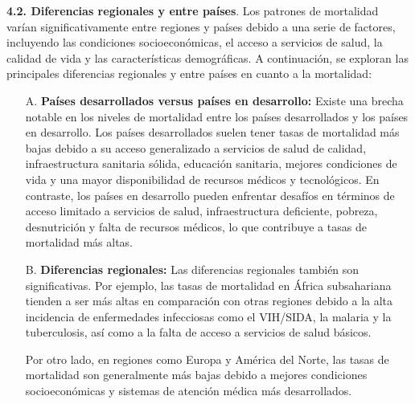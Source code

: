 \documentclass[8pt,a4paper]{beamer}
\begin{document}
{\begin{frame}{}
\setlength{\parskip}{3px}
\justifying
\begin{block}{\textbf{4.2. Diferencias regionales y entre países}.}
\setlength{\parskip}{3px}
\justifying
Los patrones de mortalidad varían significativamente entre regiones y países debido a una serie de factores, incluyendo las condiciones socioeconómicas, el acceso a servicios de salud, la calidad de vida y las características demográficas. A continuación, se exploran las principales diferencias regionales y entre países en cuanto a la mortalidad:
\begin{enumerate}
\setlength{\parskip}{3px}
\justifying
\item[A.] \textbf{Países desarrollados versus países en desarrollo:} Existe una brecha notable en los niveles de mortalidad entre los países desarrollados y los países en desarrollo. Los países desarrollados suelen tener tasas de mortalidad más bajas debido a su acceso generalizado a servicios de salud de calidad, infraestructura sanitaria sólida, educación sanitaria, mejores condiciones de vida y una mayor disponibilidad de recursos médicos y tecnológicos. En contraste, los países en desarrollo pueden enfrentar desafíos en términos de acceso limitado a servicios de salud, infraestructura deficiente, pobreza, desnutrición y falta de recursos médicos, lo que contribuye a tasas de mortalidad más altas.

\item[B.] \textbf{Diferencias regionales:} Las diferencias regionales también son significativas. Por ejemplo, las tasas de mortalidad en África subsahariana tienden a ser más altas en comparación con otras regiones debido a la alta incidencia de enfermedades infecciosas como el VIH/SIDA, la malaria y la tuberculosis, así como a la falta de acceso a servicios de salud básicos.

\end{enumerate}
\end{block}
\end{frame}

\begin{frame}{}
\setlength{\parskip}{3px}
\justifying
\begin{block}{}
\setlength{\parskip}{3px}
\justifying
\begin{enumerate}
\setlength{\parskip}{3px}
\justifying
\item[{}] Por otro lado, en regiones como Europa y América del Norte, las tasas de mortalidad son generalmente más bajas debido a mejores condiciones socioeconómicas y sistemas de atención médica más desarrollados.


\end{enumerate}
\end{block}
\end{frame}}
\end{document}
